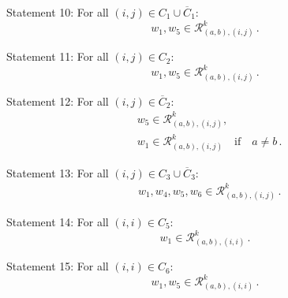 \documentclass[a4paper,11pt]{article}
\theoremstyle{plain}
\theoremstyle{definition}
\begin{document}
\begin{description}[wide, labelwidth=!, labelindent=0pt]
\item{Statement 10:} For all $(i,j)\in C_1\cup \overline{C}_1$:
\begin{equation}
    w_1,w_5\in  \mathcal{R}^k_{(a,b),(i,j)}\,.
\end{equation}
\item{Statement 11:} For all $(i,j)\in C_2$:
\begin{equation}
    w_1,w_5\in  \mathcal{R}^k_{(a,b),(i,j)}\,.
\end{equation}
\item{Statement 12:} For all $(i,j)\in \overline{C}_2$:
\begin{align}
     &w_5\in  \mathcal{R}^k_{(a,b),(i,j)},\\
     & w_1\in  \mathcal{R}^k_{(a,b),(i,j)} \quad\text{if}\quad a\neq b\,.
\end{align}
\item{Statement 13:} For all $(i,j)\in C_3\cup \overline{C}_3$:
\begin{align}
   & w_1,w_4,w_5,w_6\in  \mathcal{R}^k_{(a,b),(i,j)}\,.
\end{align}
\item{Statement 14:} For all $(i,i)\in C_5$:
\begin{equation}
    w_1\in  \mathcal{R}^k_{(a,b),(i,i)}\,.
\end{equation}
\item{Statement 15:} For all $(i,i)\in C_6$:
\begin{equation}
    w_1,w_5 \in  \mathcal{R}^k_{(a,b),(i,i)}\,.
\end{equation}

\end{description}






 

\end{document}
